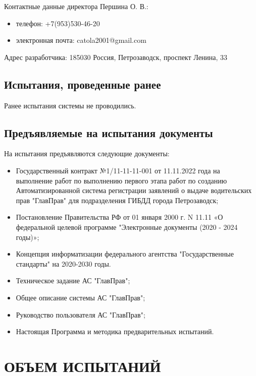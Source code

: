 \documentclass[russian, utf8, 12pt,pointsubsection,floatsubsection]{eskdtext}
\begin{document}
Контактные данные директора Першина О. В.: 
\begin{itemize}
    \item телефон: +7(953)530-46-20 
    \item электронная почта: catola2001@gmail.com
\end{itemize}

Адрес разработчика: 185030 Россия, Петрозаводск, проспект Ленина, 33\\

\subsection{Испытания, проведенные ранее}
Ранее испытания системы не проводились.\\

\subsection{Предъявляемые на испытания документы}
На испытания предъявляются следующие документы:
\begin{itemize}
    \item Государственный контракт №1/11-11-11-001 от 11.11.2022 года на выполнение работ по выполнению первого этапа работ по созданию Автоматизированной система регистрации заявлений о выдаче водительских прав "ГлавПрав" для подразделения ГИБДД города Петрозаводск;
    
    \item Постановление Правительства РФ от 01 января 2000 г. N 11.11 «О федеральной целевой программе "Электронные документы (2020 - 2024 годы)»;
    \item Концепция информатизации федерального агентства "Государственные стандарты" на 2020-2030 годы.
    \item Техническое задание АС "ГлавПрав";
    \item Общее описание системы АС "ГлавПрав";
    \item Руководство пользователя АС "ГлавПрав";
    \item Настоящая Программа и методика предварительных испытаний.
\end{itemize}

\section{ОБЪЕМ ИСПЫТАНИЙ}

\end{document}

